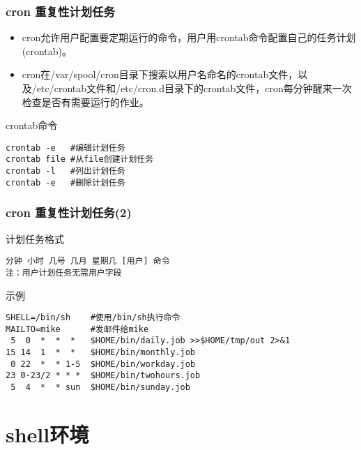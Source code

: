 \documentclass[xcolor=svgnames,presentation]{beamer}
\begin{document}
\begin{frame}[fragile]
\frametitle{cron 重复性计划任务}
\label{sec-3-1-11}
\begin{itemize}

\item cron允许用户配置要定期运行的命令，用户用crontab命令配置自己的任务计划(crontab)。
\label{sec-3-1-11-1}%

\item cron在/var/spool/cron目录下搜索以用户名命名的crontab文件，以及/etc/crontab文件和/etc/cron.d目录下的crontab文件，cron每分钟醒来一次检查是否有需要运行的作业。
\label{sec-3-1-11-2}%
\end{itemize} %
\begin{exampleblock}{crontab命令}
\label{sec-3-1-11-3}


\begin{verbatim}
crontab -e   #编辑计划任务
crontab file #从file创建计划任务
crontab -l   #列出计划任务
crontab -e   #删除计划任务
\end{verbatim}
\end{exampleblock}
\end{frame}
\begin{frame}[fragile]
\frametitle{cron 重复性计划任务(2)}
\label{sec-3-1-12}
\begin{block}{计划任务格式}
\label{sec-3-1-12-1}


\begin{verbatim}
分钟 小时 几号 几月 星期几 [用户] 命令
注：用户计划任务无需用户字段
\end{verbatim}
\end{block}
\begin{exampleblock}{示例}
\label{sec-3-1-12-2}


\begin{verbatim}
SHELL=/bin/sh    #使用/bin/sh执行命令
MAILTO=mike      #发邮件给mike
 5  0  *  *  *   $HOME/bin/daily.job >>$HOME/tmp/out 2>&1
15 14  1  *  *   $HOME/bin/monthly.job
 0 22  *  * 1-5  $HOME/bin/workday.job
23 0-23/2 * * *  $HOME/bin/twohours.job
 5  4  *  * sun  $HOME/bin/sunday.job
\end{verbatim}
\end{exampleblock}
\end{frame}
\section{shell环境}
\label{sec-4}
\end{document}
